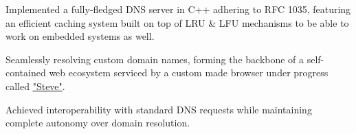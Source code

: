 \documentclass[]{deedy-resume-openfont}
\begin{document}
\begin{minipage}[t]{0.66\textwidth}
\begin{tightemize}
\item Implemented a fully-fledged DNS server in C++ adhering to RFC 1035, featuring an efficient caching system built on top of LRU \& LFU mechanisms to be able to work on embedded systems as well.
\item Seamlessly resolving custom domain names, forming the backbone of a self-contained web ecosystem serviced by a custom made browser under progress called \href{https://github.com/yogesh-aggarwal/steve}{\underline{"Steve"}}.
\item Achieved interoperability with standard DNS requests while maintaining complete autonomy over domain resolution.
\end{tightemize}
\sectionsep

\end{minipage}
\end{document}
